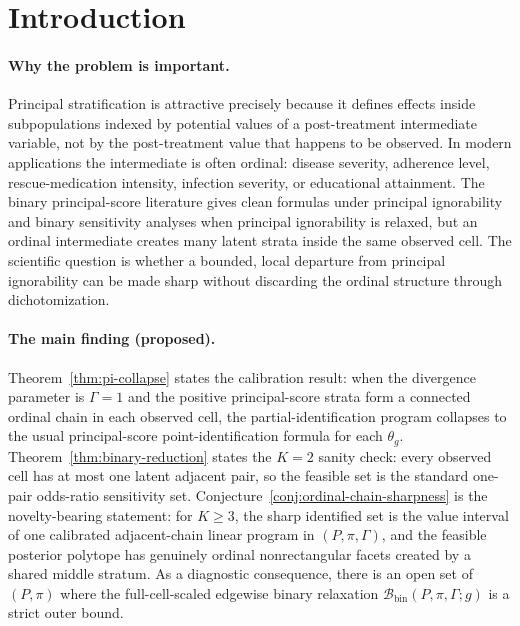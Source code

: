 \documentclass[11pt]{article}
\theoremstyle{definition}
\theoremstyle{plain}
\theoremstyle{remark}
\begin{document}
\section{Introduction}
\paragraph{Why the problem is important.}
Principal stratification is attractive precisely because it defines effects inside subpopulations indexed by potential values of a post-treatment intermediate variable, not by the post-treatment value that happens to be observed.  In modern applications the intermediate is often ordinal: disease severity, adherence level, rescue-medication intensity, infection severity, or educational attainment.  The binary principal-score literature gives clean formulas under principal ignorability and binary sensitivity analyses when principal ignorability is relaxed, but an ordinal intermediate creates many latent strata inside the same observed cell.  The scientific question is whether a bounded, local departure from principal ignorability can be made sharp without discarding the ordinal structure through dichotomization.

\paragraph{The main finding (proposed).}
Theorem~\ref{thm:pi-collapse} states the calibration result: when the divergence parameter is \(\Gamma=1\) and the positive principal-score strata form a connected ordinal chain in each observed cell, the partial-identification program collapses to the usual principal-score point-identification formula for each \(\theta_g\).  Theorem~\ref{thm:binary-reduction} states the \(K=2\) sanity check: every observed cell has at most one latent adjacent pair, so the feasible set is the standard one-pair odds-ratio sensitivity set.  Conjecture~\ref{conj:ordinal-chain-sharpness} is the novelty-bearing statement: for \(K\ge 3\), the sharp identified set is the value interval of one calibrated adjacent-chain linear program in \((P,\pi,\Gamma)\), and the feasible posterior polytope has genuinely ordinal nonrectangular facets created by a shared middle stratum.  As a diagnostic consequence, there is an open set of \((P,\pi)\) where the full-cell-scaled edgewise binary relaxation \(\mathcal B_{\mathrm{bin}}(P,\pi,\Gamma;g)\) is a strict outer bound.
\end{document}
